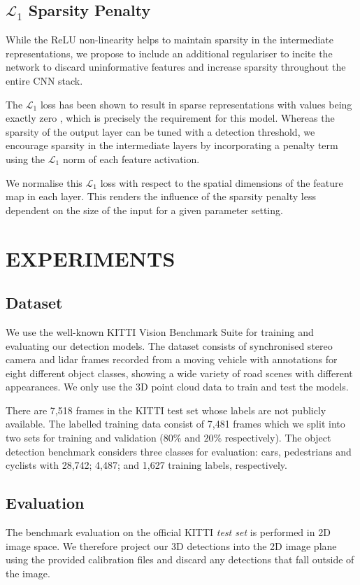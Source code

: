 \documentclass[letterpaper, 10 pt, conference]{tex_style/ieeeconf}
\begin{document}
\subsection{$\mathcal{L}_1$ Sparsity Penalty}
While the ReLU non-linearity helps to maintain sparsity in the intermediate representations, we propose to include an additional regulariser to incite the network to discard uninformative features and increase sparsity throughout the entire CNN stack.

The $\mathcal{L}_1$ loss has been shown to result in sparse representations with values being exactly zero \cite{murphy2012machine}, which is precisely the requirement for this model.
Whereas the sparsity of the output layer can be tuned with a detection threshold, we encourage sparsity in the intermediate layers by incorporating a penalty term using the $\mathcal{L}_1$ norm of each feature activation.

We normalise this $\mathcal{L}_1$ loss with respect to the spatial dimensions of the feature map in each layer.
This renders the influence of the sparsity penalty less dependent on the size of the input for a given parameter setting. 

\section{EXPERIMENTS}
\label{sec:experiments}


\subsection{Dataset}
We use the well-known KITTI Vision Benchmark Suite \cite{Geiger2012CVPR} for training and evaluating our detection models.
The dataset consists of synchronised stereo camera and lidar frames recorded from a moving vehicle with annotations for eight different object classes, showing a wide variety of road scenes with different appearances.
We only use the 3D point cloud data to train and test the models.

There are 7,518 frames in the KITTI test set whose labels are not publicly available.
The labelled training data consist of 7,481 frames which we split into two sets for training and validation ($80\%$ and $20\%$ respectively). 
The object detection benchmark considers three classes for evaluation: cars, pedestrians and cyclists with 28,742; 4,487; and 1,627 training labels, respectively.



\subsection{Evaluation}
The benchmark evaluation on the official KITTI \emph{test set} is performed in 2D image space.
We therefore project our 3D detections into the 2D image plane using the provided calibration files and discard any detections that fall outside of the image.
\end{document}
